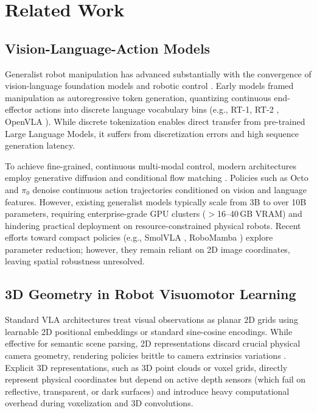 \section{Related Work}
\label{sec:related_work}

\subsection{Vision-Language-Action Models}
Generalist robot manipulation has advanced substantially with the convergence of vision-language foundation models and robotic control \cite{open_x_embodiment_rt_x_2023,kim2024openvla,black2024pi_0,octo2023}. Early models framed manipulation as autoregressive token generation, quantizing continuous end-effector actions into discrete language vocabulary bins (e.g., RT-1, RT-2 \cite{open_x_embodiment_rt_x_2023}, OpenVLA \cite{kim2024openvla}). While discrete tokenization enables direct transfer from pre-trained Large Language Models, it suffers from discretization errors and high sequence generation latency.

To achieve fine-grained, continuous multi-modal control, modern architectures employ generative diffusion and conditional flow matching \cite{chi2023diffusion,peebles2023scalable,black2024pi_0,shukor2025smolvla}. Policies such as Octo \cite{octo2023} and $\pi_0$ \cite{black2024pi_0} denoise continuous action trajectories conditioned on vision and language features. However, existing generalist models typically scale from 3B to over 10B parameters, requiring enterprise-grade GPU clusters ($>$16--40\,GB VRAM) and hindering practical deployment on resource-constrained physical robots. Recent efforts toward compact policies (e.g., SmolVLA \cite{shukor2025smolvla}, RoboMamba \cite{liu2024robomamba}) explore parameter reduction; however, they remain reliant on 2D image coordinates, leaving spatial robustness unresolved.

\subsection{3D Geometry in Robot Visuomotor Learning}
Standard VLA architectures treat visual observations as planar 2D grids using learnable 2D positional embeddings or standard sine-cosine encodings. While effective for semantic scene parsing, 2D representations discard crucial physical camera geometry, rendering policies brittle to camera extrinsics variations \cite{liberomax2024}. Explicit 3D representations, such as 3D point clouds or voxel grids, directly represent physical coordinates but depend on active depth sensors (which fail on reflective, transparent, or dark surfaces) and introduce heavy computational overhead during voxelization and 3D convolutions.

